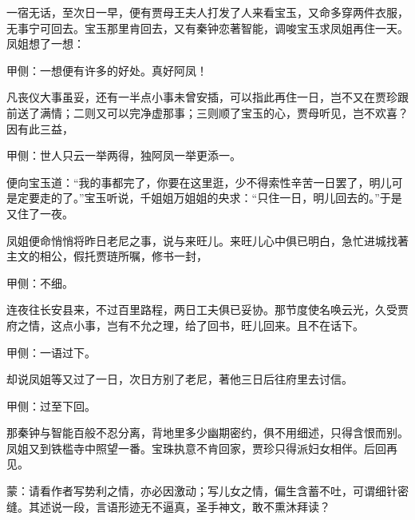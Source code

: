 \begin{parag}
    一宿无话，至次日一早，便有贾母王夫人打发了人来看宝玉，又命多穿两件衣服，无事宁可回去。宝玉那里肯回去，又有秦钟恋著智能，调唆宝玉求凤姐再住一天。凤姐想了一想：\begin{note}甲侧：一想便有许多的好处。真好阿凤！\end{note}凡丧仪大事虽妥，还有一半点小事未曾安插，可以指此再住一日，岂不又在贾珍跟前送了满情；二则又可以完净虚那事；三则顺了宝玉的心，贾母听见，岂不欢喜？因有此三益，\begin{note}甲侧：世人只云一举两得，独阿凤一举更添一。\end{note}便向宝玉道：“我的事都完了，你要在这里逛，少不得索性辛苦一日罢了，明儿可是定要走的了。”宝玉听说，千姐姐万姐姐的央求：“只住一日，明儿回去的。”于是又住了一夜。
\end{parag}


\begin{parag}
    凤姐便命悄悄将昨日老尼之事，说与来旺儿。来旺儿心中俱已明白，急忙进城找著主文的相公，假托贾琏所嘱，修书一封，\begin{note}甲侧：不细。\end{note}连夜往长安县来，不过百里路程，两日工夫俱已妥协。那节度使名唤云光，久受贾府之情，这点小事，岂有不允之理，给了回书，旺儿回来。且不在话下。\begin{note}甲侧：一语过下。\end{note}
\end{parag}


\begin{parag}
    却说凤姐等又过了一日，次日方别了老尼，著他三日后往府里去讨信。\begin{note}甲侧：过至下回。\end{note}那秦钟与智能百般不忍分离，背地里多少幽期密约，俱不用细述，只得含恨而别。凤姐又到铁槛寺中照望一番。宝珠执意不肯回家，贾珍只得派妇女相伴。后回再见。
\end{parag}


\begin{parag}
    \begin{note}蒙：请看作者写势利之情，亦必因激动；写儿女之情，偏生含蓄不吐，可谓细针密缝。其述说一段，言语形迹无不逼真，圣手神文，敢不熏沐拜读？\end{note}
\end{parag}